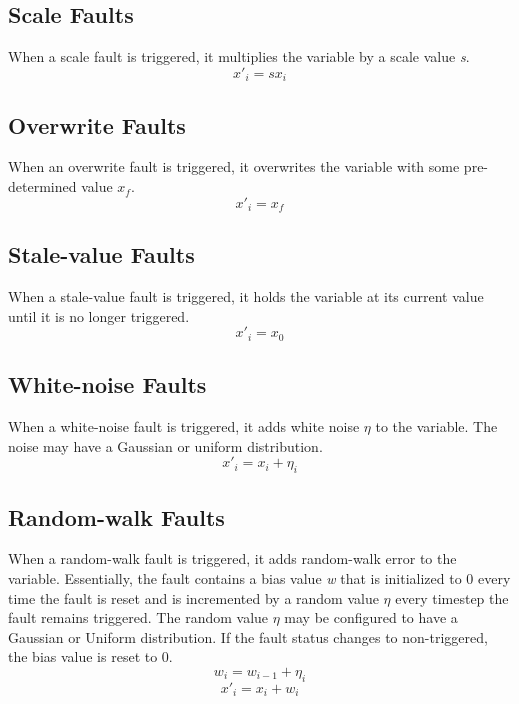 \documentclass[11pt,fleqn]{report}
\begin{document}
\subsection{Scale Faults}
\par When a scale fault is triggered, it multiplies the variable by a scale
value \textit{s}.
\begin{equation}
x'_i = s x_i
\end{equation}

\subsection{Overwrite Faults}
\par When an overwrite fault is triggered, it overwrites the variable with some
pre-determined value $x_f$.
\begin{equation}
x'_i = x_f
\end{equation}

\subsection{Stale-value Faults}
\par When a stale-value fault is triggered, it holds the variable at its current
value until it is no longer triggered.
\begin{equation}
x'_i = x_0
\end{equation}

\subsection{White-noise Faults}
\par When a white-noise fault is triggered, it adds white noise $\eta$ to the
variable. The noise may have a Gaussian or uniform distribution.
\begin{equation}
x'_i = x_i + \eta_i
\end{equation}

\subsection{Random-walk Faults} \label{sec:intro:randomwalk}
\par When a random-walk fault is triggered, it adds random-walk error to the
variable. Essentially, the fault contains a bias value \textit{w} that is
initialized to 0 every time the fault is reset and is incremented by a random
value $\eta$ every timestep the fault remains triggered.
The random value $\eta$ may be configured to have a Gaussian or Uniform
distribution.
If the fault status changes to non-triggered, the bias value is reset to 0.
\begin{equation*}
w_i = w_{i-1} + \eta_i
\end{equation*}
\begin{equation}
x'_i = x_i + w_i
\end{equation}
\end{document}
